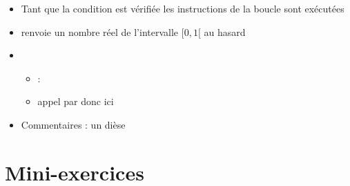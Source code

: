 \begin{frame}[fragile]

\begin{itemize}


  \item {}   
Tant que la condition est vérifiée les instructions de la boucle sont exécutées

   
\pause   

  \item {} renvoie un nombre réel de l'intervalle $[0,1[$ au hasard 
  
\pause

  \item
  \begin{itemize}
    \item {} : 
    \item appel par  donc ici 
  \end{itemize}
   
\pause 

  \item Commentaires : un dièse \codeinline{#}


\end{itemize}
\end{frame}





\section{Mini-exercices}

